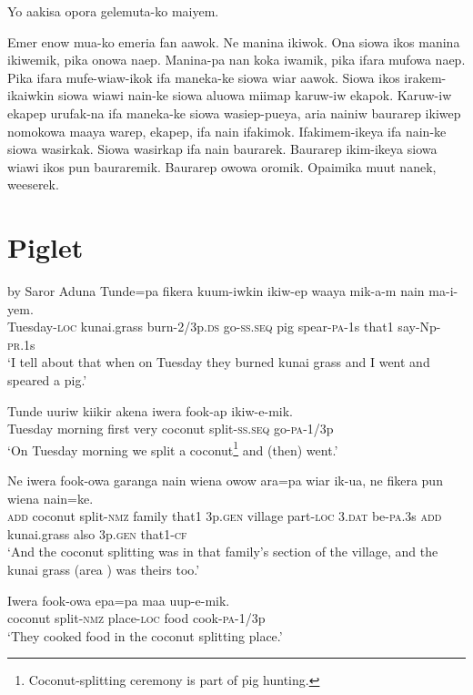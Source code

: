 Yo aakisa opora gelemuta-ko maiyem.

Emer enow mua-ko emeria fan aawok. 
Ne manina ikiwok. 
Ona siowa ikos manina ikiwemik, pika onowa naep. 
Manina-pa nan koka iwamik, pika ifara mufowa naep. 
Pika ifara mufe-wiaw-ikok ifa maneka-ke siowa wiar aawok. 
Siowa ikos irakem-ikaiwkin siowa wiawi nain-ke siowa aluowa miimap karuw-iw ekapok. 
Karuw-iw ekapep urufak-na ifa maneka-ke siowa wasiep-pueya,  aria nainiw baurarep ikiwep nomokowa maaya warep, ekapep, ifa nain ifakimok. 
Ifakimem-ikeya ifa nain-ke siowa wasirkak. 
Siowa wasirkap ifa nain baurarek. 
Baurarep ikim-ikeya siowa wiawi ikos pun bauraremik. 
Baurarep owowa oromik. 
Opaimika muut nanek, weeserek. 


\section{Piglet}\label{app:2:piglet}
by Saror Aduna
\ea
\gll  Tunde=pa  fikera  kuum-iwkin  ikiw-ep  waaya      mik-a-m  nain  ma-i-yem. \\
Tuesday-\textsc{loc}  kunai.grass  burn-2/3p.\textsc{ds}  go-\textsc{ss.seq}  pig  spear-\textsc{pa}-1s  that1  say-Np-\textsc{pr}.1s \\


\glt ‘I tell about that when on Tuesday they burned kunai grass and I went and speared a pig.’ \\
\z


\ea
\gll  Tunde  uuriw  kiikir  akena  iwera  fook-ap  ikiw-e-mik. \\
Tuesday  morning  first  very  coconut  split-\textsc{ss.seq}  go-\textsc{pa}-1/3p \\
\glt ‘On Tuesday morning we split a coconut\footnote{Coconut-splitting ceremony is part of pig hunting.} and (then) went.’ \\
\z


\ea
\gll  Ne  iwera  fook-owa  garanga  nain  wiena  owow  ara=pa      wiar  ik-ua,  ne  fikera  pun  wiena  nain=ke. \\
\textsc{add}  coconut  split-\textsc{nmz}  family  that1  3p.\textsc{gen}  village  part-\textsc{loc}  3.\textsc{dat}  be-\textsc{pa}.3s  \textsc{add}  kunai.grass  also  3p.\textsc{gen}  that1-\textsc{cf} \\


\glt ‘And the coconut splitting was in that family’s section of the village, and the kunai grass (area ) was theirs too.’ \\
\z


\ea
\gll  Iwera  fook-owa  epa=pa  maa  uup-e-mik. \\
coconut  split-\textsc{nmz}  place-\textsc{loc}  food  cook-\textsc{pa}-1/3p \\
\glt ‘They cooked food in the coconut splitting place.’ \\
\z


